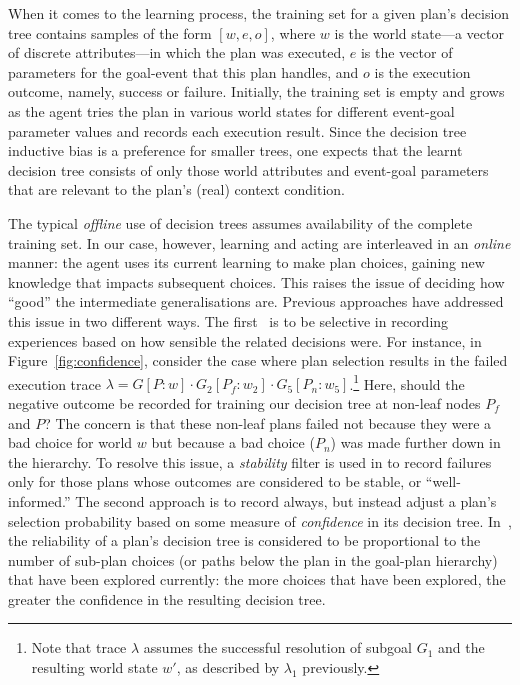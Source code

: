 When it comes to the learning process, the training set for a given plan's decision tree contains samples of the form $[w, e, o]$, where $w$ is the world state---a vector of discrete attributes---in which the plan was executed, $e$ is the vector of parameters for the goal-event that this plan handles, and $o$ is the execution outcome, namely, success or failure. Initially, the training set is empty and grows as the agent tries the plan in various world states for different event-goal parameter values and records each execution result. 
Since the decision tree inductive bias is a preference for smaller trees, one expects that the learnt decision tree consists of only those world attributes and event-goal parameters that are relevant to the plan's (real) context condition.

The typical {\em offline} use of decision trees assumes availability of the complete training set. In our case, however, learning and acting are interleaved in an {\em online} manner: the agent uses its current learning to make plan choices, gaining new knowledge that impacts subsequent choices. This raises the issue of deciding how ``good'' the intermediate generalisations are. Previous approaches have addressed this issue in two different ways. The first~\cite{airiau09:enhancing} is to be selective in recording experiences based on how sensible the related decisions were. For instance, in Figure~\ref{fig:confidence}, consider the case where plan selection results in the failed execution trace $\lambda = G[P:w] \cdot G_2[P_f:w_2] \cdot G_5[P_n:w_5]$.\footnote{Note that trace $\lambda$ assumes the successful resolution of subgoal $G_1$ and the resulting world state $w'$, as described by $\lambda_1$ previously.} Here, should the negative outcome be recorded for training our decision tree at non-leaf nodes $P_f$ and $P$? The concern is that these non-leaf plans failed not because they were a bad choice for world $w$ but because a bad choice ($P_n$) was made further down in the hierarchy. To resolve this issue, a {\em stability} filter is used in \cite{airiau09:enhancing} to record failures only for those plans whose outcomes are considered to be stable, or ``well-informed.'' The second approach is to record always, but instead adjust a plan's selection probability based on some measure of {\em confidence} in its decision tree. In~\cite{singh10:extending,singh10:learning}, the reliability of a plan's decision tree is considered to be proportional to the number of sub-plan choices (or paths below the plan in the goal-plan hierarchy) that have been explored currently: the more choices that have been explored, the greater the confidence in the resulting decision tree. 

